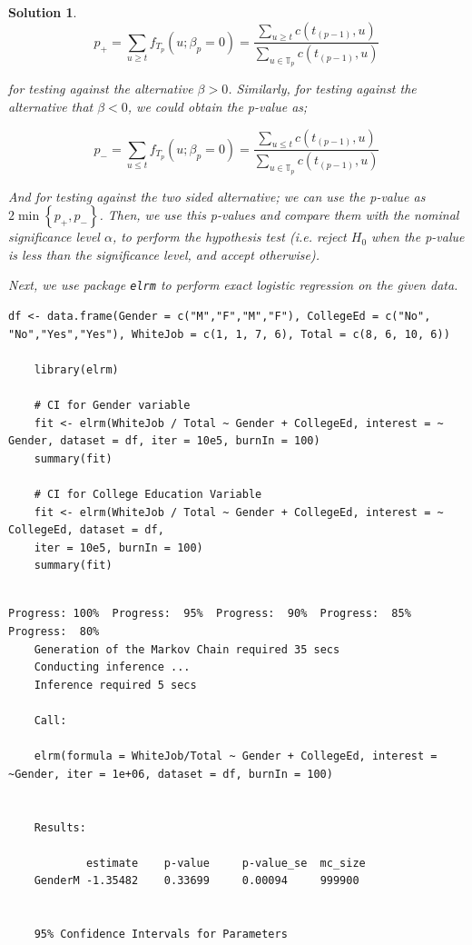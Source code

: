 \documentclass[12pt]{article}
\theoremstyle{problemstyle}
\newtheorem*{solution*}{Solution}
\begin{document}
\begin{solution*}
$$p_{+} = \sum_{u \geq t} f_{T_p}(u; \beta_p = 0) = \frac{\sum_{u \geq t} c(t_{(p-1)}, u)}{\sum_{u \in \mathbb{T}_p} c(t_{(p-1)}, u)}$$

for testing against the alternative $\beta > 0$. Similarly, for testing against the alternative that $\beta < 0$, we could obtain the p-value as; 

$$p_{-} = \sum_{u \leq t} f_{T_p}(u; \beta_p = 0) = \frac{\sum_{u \leq t} c(t_{(p-1)}, u)}{\sum_{u \in \mathbb{T}_p} c(t_{(p-1)}, u)}$$

And for testing against the two sided alternative; we can use the p-value as $2 \min\left\{  p_{+}, p_{-} \right\}$. Then, we use this p-values and compare them with the nominal significance level $\alpha$, to perform the hypothesis test (i.e. reject $H_0$ when the p-value is less than the significance level, and accept otherwise).

Next, we use package \texttt{elrm} to perform exact logistic regression on the given data.

\begin{lstlisting}[style = R-code]
	df <- data.frame(Gender = c("M","F","M","F"), CollegeEd = c("No", "No","Yes","Yes"), WhiteJob = c(1, 1, 7, 6), Total = c(8, 6, 10, 6))
	
	library(elrm)
	
	# CI for Gender variable
	fit <- elrm(WhiteJob / Total ~ Gender + CollegeEd, interest = ~ Gender, dataset = df, iter = 10e5, burnIn = 100)
	summary(fit)
	
	# CI for College Education Variable
	fit <- elrm(WhiteJob / Total ~ Gender + CollegeEd, interest = ~ CollegeEd, dataset = df, 
	iter = 10e5, burnIn = 100)
	summary(fit)
	
\end{lstlisting}

\begin{lstlisting}[style = R-output]
	Progress: 100%  Progress:  95%  Progress:  90%  Progress:  85%  Progress:  80%                  
	Generation of the Markov Chain required 35 secs
	Conducting inference ...
	Inference required 5 secs
	
	Call:
	
	elrm(formula = WhiteJob/Total ~ Gender + CollegeEd, interest = ~Gender, iter = 1e+06, dataset = df, burnIn = 100)
	
	
	Results:
	
			estimate 	p-value 	p-value_se 	mc_size
	GenderM -1.35482 	0.33699    	0.00094  	999900
	
	
	95% Confidence Intervals for Parameters
	

\end{lstlisting}
\end{solution*}
\end{document}
